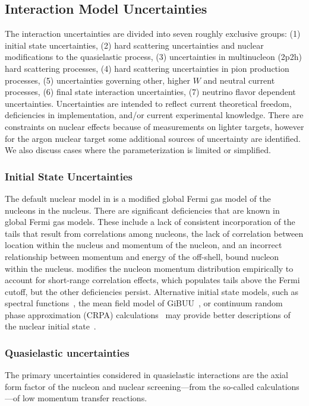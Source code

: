 \subsection{Interaction Model Uncertainties}

The interaction uncertainties are divided into seven roughly exclusive groups: (1) initial state uncertainties, (2) hard scattering uncertainties and nuclear modifications to the quasielastic process, (3) uncertainties in multinucleon (2p2h) hard scattering processes, (4) hard scattering uncertainties in pion production processes, (5) uncertainties governing other, higher $W$ and neutral current processes, (6) final state interaction uncertainties, (7) neutrino flavor dependent uncertainties. Uncertainties are intended to reflect current theoretical freedom, deficiencies in implementation, and/or current experimental knowledge.  
There are constraints on nuclear effects because of measurements on lighter targets, however for the argon nuclear target some additional sources of uncertainty are identified.  We also discuss cases where the parameterization is limited or simplified.

\subsubsection{Initial State Uncertainties}
The default nuclear model in  is a modified global Fermi gas model of the nucleons in the nucleus.  There are significant deficiencies that are known in global Fermi gas models. These include a lack of consistent incorporation of the tails that result from correlations among nucleons, the lack of correlation between location within the nucleus and momentum of the nucleon, and an incorrect relationship between momentum and energy of the off-shell, bound nucleon within the nucleus.  modifies the nucleon momentum distribution empirically to account for short-range correlation effects, which populates tails above the Fermi cutoff, but the other deficiencies persist. Alternative initial state models, such as spectral functions~\cite{Benhar:1994hw,Nieves:2004wx}, the mean field model of GiBUU~\cite{Gallmeister:2016dnq}, or continuum random phase approximation (CRPA) calculations~\cite{Pandey:2014tza} may provide better descriptions of the nuclear initial state~\cite{Sobczyk:2017mts}. 

\subsubsection{Quasielastic uncertainties}
The primary uncertainties considered in quasielastic interactions are the axial form factor of the nucleon and nuclear screening---from the so-called   calculations---of low momentum transfer reactions.

